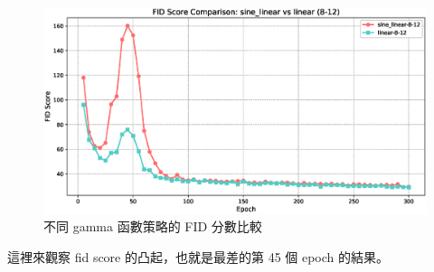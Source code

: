 \begin{figure}[h]
    \centering
    \includegraphics[width=\textwidth]{figures/fid_comparison_8_12.eps}
    \caption{不同 gamma 函數策略的 FID 分數比較}
    \label{fig:fid_comparison_8_12}
\end{figure}


這裡來觀察 fid score 的凸起，也就是最差的第 45 個 epoch 的結果。

